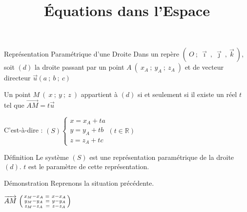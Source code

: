 \documentclass{cours}
\title{Équations dans l'Espace}
\begin{document}

    \begin{Gpartie}{Représentation Paramétrique d'une Droite} 
        Dans un repère $\left(~O~;~\vec{\imath}~,~\vec{\jmath}~,~\vec{k}~\right)$, soit $(d)$ la droite passant par un point $A~\left(~x_A~;~y_A~;~z_A~\right)$ et de vecteur directeur $\vec{u}~\big(~a~;~b~;~c~\big)$

        Un point $M~\left(~x~;~y~;~z~\right)$ appartient à $(d)$ si et seulement si il existe un réel $t$ tel que $\overrightarrow{AM}=t\vec{u}$

        C'est-à-dire : $(S)\begin{cases} x=x_A+ta \\ y=y_A+tb \\ z=z_A+tc \end{cases}\left(t\in\mathbb{R}\right)$

        \begin{Spartie}{Définition} 
            Le système $(S)$ est une représentation paramétrique de la droite $(d)$. $t$ est le paramètre de cette représentation.
            \begin{SSpartie}{Démonstration}
                Reprenons la situation précédente. 
                
                $\overrightarrow{AM}~\begin{psmallmatrix} x_M-x_A &=\ x-x_A \\ y_M-y_A &=\ y-y_A \\ z_M-z_A &=\ z-z_A \end{psmallmatrix}$


\end{SSpartie}
\end{Spartie}
\end{Gpartie}
\end{document}
